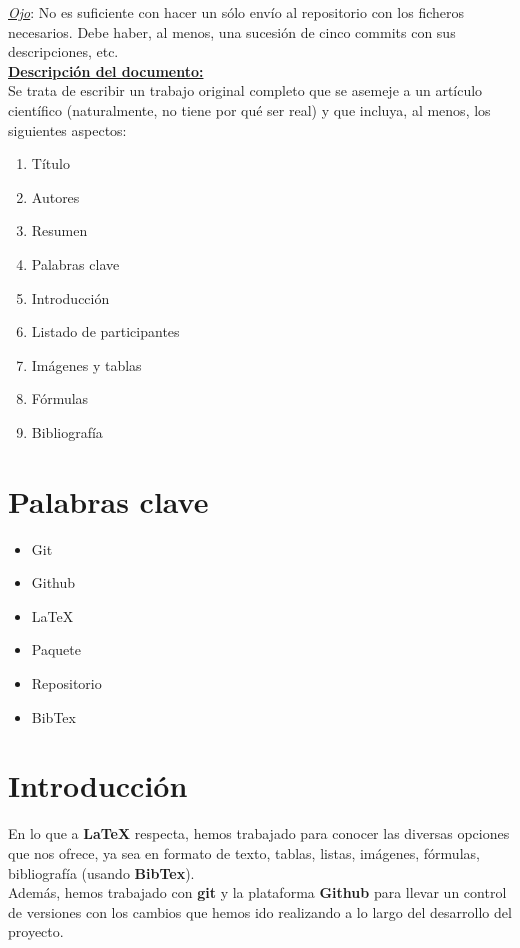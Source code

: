 \documentclass[a4paper,11pt]{article}
\begin{document}
\textit{\underline{Ojo}}: No es suficiente con hacer un sólo envío al repositorio con los ficheros necesarios. Debe haber, al menos, una sucesión de cinco commits con sus descripciones, etc.\\

\textbf{\underline{Descripción del documento:}}\\

Se trata de escribir un trabajo original completo que se asemeje a un artículo científico (naturalmente, no tiene por qué ser real) y que incluya, al menos, los siguientes aspectos:

\begin{enumerate}[{Apartado} 1.]
	\item Título
	\item Autores
	\item Resumen
	\item Palabras clave
	\item Introducción
	\item Listado de participantes
	\item Imágenes y tablas
	\item Fórmulas
	\item Bibliografía
\end{enumerate}

\section{Palabras clave}

\begin{itemize}
	\item Git
	\item Github
	\item LaTeX
	\item Paquete
	\item Repositorio
	\item BibTex
\end{itemize}

\section{Introducción}

En lo que a \textbf{LaTeX} respecta, hemos trabajado para conocer las diversas opciones que nos ofrece, ya sea en formato de texto, tablas, listas, imágenes, fórmulas, bibliografía (usando \textbf{BibTex}).\\

Además, hemos trabajado con \textbf{git} y la plataforma \textbf{Github} para llevar un control de versiones con los cambios que hemos ido realizando a lo largo del desarrollo del proyecto.
\end{document}
